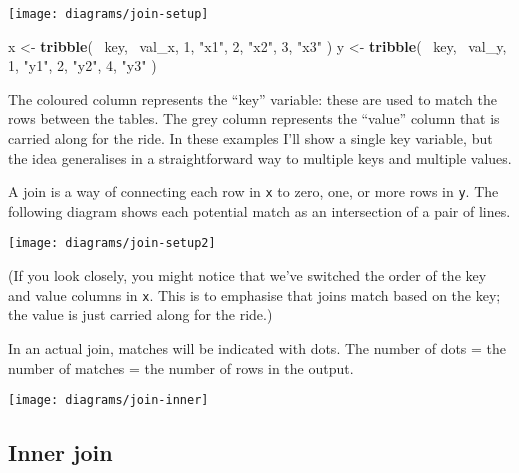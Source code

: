 \documentclass[]{book}
\newenvironment{Shaded}{\begin{snugshade}}{\end{snugshade}}
\newcommand{\KeywordTok}[1]{\textcolor[rgb]{0.13,0.29,0.53}{\textbf{{#1}}}}
\newcommand{\DecValTok}[1]{\textcolor[rgb]{0.00,0.00,0.81}{{#1}}}
\newcommand{\StringTok}[1]{\textcolor[rgb]{0.31,0.60,0.02}{{#1}}}
\newcommand{\NormalTok}[1]{{#1}}
\begin{document}
\begin{center}\texttt{[image: diagrams/join-setup]} \end{center}

\begin{Shaded}
\begin{Highlighting}[]
\NormalTok{x <-}\StringTok{ }\KeywordTok{tribble}\NormalTok{(}
  \NormalTok{~key, ~val_x,}
     \DecValTok{1}\NormalTok{, }\StringTok{"x1"}\NormalTok{,}
     \DecValTok{2}\NormalTok{, }\StringTok{"x2"}\NormalTok{,}
     \DecValTok{3}\NormalTok{, }\StringTok{"x3"}
\NormalTok{)}
\NormalTok{y <-}\StringTok{ }\KeywordTok{tribble}\NormalTok{(}
  \NormalTok{~key, ~val_y,}
     \DecValTok{1}\NormalTok{, }\StringTok{"y1"}\NormalTok{,}
     \DecValTok{2}\NormalTok{, }\StringTok{"y2"}\NormalTok{,}
     \DecValTok{4}\NormalTok{, }\StringTok{"y3"}
\NormalTok{)}
\end{Highlighting}
\end{Shaded}

The coloured column represents the ``key'' variable: these are used to
match the rows between the tables. The grey column represents the
``value'' column that is carried along for the ride. In these examples
I'll show a single key variable, but the idea generalises in a
straightforward way to multiple keys and multiple values.

A join is a way of connecting each row in \texttt{x} to zero, one, or
more rows in \texttt{y}. The following diagram shows each potential
match as an intersection of a pair of lines.

\begin{center}\texttt{[image: diagrams/join-setup2]} \end{center}

(If you look closely, you might notice that we've switched the order of
the key and value columns in \texttt{x}. This is to emphasise that joins
match based on the key; the value is just carried along for the ride.)

In an actual join, matches will be indicated with dots. The number of
dots = the number of matches = the number of rows in the output.

\begin{center}\texttt{[image: diagrams/join-inner]} \end{center}

\subsection{Inner join}\label{inner-join}
\end{document}
